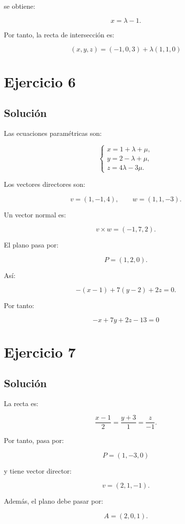 \documentclass[11pt,a4paper]{article}
\begin{document}
se obtiene:

\[
x=\lambda-1.
\]

Por tanto, la recta de intersección es:

\[
\boxed{
(x,y,z)
=
(-1,0,3)
+
\lambda(1,1,0)
}
\]

\section{Ejercicio 6}
\subsection{Solución}

Las ecuaciones paramétricas son:

\[
\begin{cases}
x=1+\lambda+\mu,\\
y=2-\lambda+\mu,\\
z=4\lambda-3\mu.
\end{cases}
\]

Los vectores directores son:

\[
v=(1,-1,4),
\qquad
w=(1,1,-3).
\]

Un vector normal es:

\[
v\times w
=
(-1,7,2).
\]

El plano pasa por:

\[
P=(1,2,0).
\]

Así:

\[
-(x-1)+7(y-2)+2z=0.
\]

Por tanto:

\[
\boxed{
-x+7y+2z-13=0
}
\]

\section{Ejercicio 7}
\subsection{Solución}

La recta es:

\[
\frac{x-1}{2}
=
\frac{y+3}{1}
=
\frac{z}{-1}.
\]

Por tanto, pasa por:

\[
P=(1,-3,0)
\]

y tiene vector director:

\[
v=(2,1,-1).
\]

Además, el plano debe pasar por:

\[
A=(2,0,1).
\]
\end{document}
